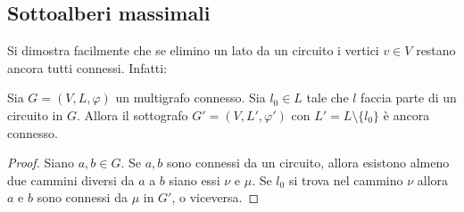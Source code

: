 \subsection{Sottoalberi massimali}


Si dimostra facilmente che se elimino un lato da un circuito i vertici $v \in V$ restano ancora tutti connessi. Infatti:

\begin{propbox}
	Sia $G=(V,L, \varphi)$ un multigrafo connesso. Sia $l_{0} \in L$ tale che $l$ faccia parte di un circuito in $G$. Allora il sottografo $G'=(V,L',\varphi')$ con $L'=L \setminus \{l_{0}\}$ è ancora connesso.
\end{propbox}

\begin{proof}
	 Siano $a,b \in G$. Se $a,b$ sono connessi da un circuito, allora esistono almeno due cammini diversi da $a$ a $b$ siano essi $\nu$ e $\mu$. Se $l_{0}$ si trova nel cammino $\nu$ allora $a$ e $b$ sono connessi da $\mu$ in $G'$, o viceversa.
\end{proof}

